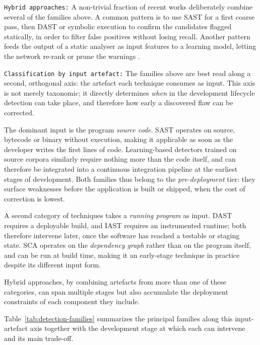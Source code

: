 \texttt{Hybrid approaches:}
A non-trivial fraction of recent works deliberately combine several of
the families above. A common pattern is to use SAST for a first coarse
pass, then DAST or symbolic execution to confirm the candidates flagged
statically, in order to filter false positives without losing recall.
Another pattern feeds the output of a static analyser as input features
to a learning model, letting the network re-rank or prune the warnings
\citep{placeholder-hybrid} .

\texttt{Classification by input artefact:}
The families above are best read along a second, orthogonal axis: the
artefact each technique consumes as input. This axis is not merely
taxonomic; it directly determines \emph{when} in the development
lifecycle detection can take place, and therefore how early a discovered
flaw can be corrected.

The dominant input is the program \emph{source code}. SAST operates on
source, bytecode or binary without execution, making it applicable as
soon as the developer writes the first lines of code. Learning-based
detectors trained on source corpora similarly require nothing more than
the code itself, and can therefore be integrated into a continuous
integration pipeline at the earliest stages of development. Both
families thus belong to the \emph{pre-deployment} tier: they surface
weaknesses before the application is built or shipped, when the cost of
correction is lowest.

A second category of techniques takes a \emph{running program} as
input. DAST requires a deployable build, and IAST requires an
instrumented runtime; both therefore intervene later, once the software
has reached a testable or staging state. SCA operates on the
\emph{dependency graph} rather than on the program itself, and can be
run at build time, making it an early-stage technique in practice
despite its different input form.

Hybrid approaches, by combining artefacts from more than one of these
categories, can span multiple stages but also accumulate the deployment
constraints of each component they include.

Table~\ref{tab:detection-families} summarizes the principal families
along this input-artefact axis together with the development stage at
which each can intervene and its main trade-off.

